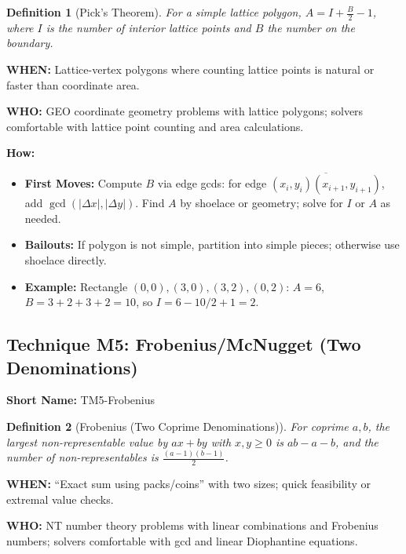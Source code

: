 \documentclass[12pt]{article}
\newtheorem{definition}{Definition}[section]
\begin{document}
\begin{definition}[Pick's Theorem]
For a simple lattice polygon, $A = I + \tfrac{B}{2} - 1$, where $I$ is the number of interior lattice points and $B$ the number on the boundary.
\end{definition}

\textbf{WHEN:} Lattice-vertex polygons where counting lattice points is natural or faster than coordinate area.

\textbf{WHO:} GEO coordinate geometry problems with lattice polygons; solvers comfortable with lattice point counting and area calculations.

\textbf{How:}
\begin{itemize}
    \item \textbf{First Moves:} Compute $B$ via edge gcds: for edge $\overline{(x_i,y_i)(x_{i+1},y_{i+1})}$, add $\gcd(|\Delta x|,|\Delta y|)$. Find $A$ by shoelace or geometry; solve for $I$ or $A$ as needed.
    \item \textbf{Bailouts:} If polygon is not simple, partition into simple pieces; otherwise use shoelace directly.
    \item \textbf{Example:} Rectangle $(0,0),(3,0),(3,2),(0,2)$: $A=6$, $B=3+2+3+2=10$, so $I=6-10/2+1=2$.
\end{itemize}

\subsection{Technique M5: Frobenius/McNugget (Two Denominations)}
\textbf{Short Name:} TM5-Frobenius

\begin{definition}[Frobenius (Two Coprime Denominations)]
For coprime $a,b$, the largest non\mbox{-}representable value by $ax+by$ with $x,y\ge 0$ is $ab-a-b$, and the number of non\mbox{-}representables is $\tfrac{(a-1)(b-1)}{2}$.
\end{definition}

\textbf{WHEN:} ``Exact sum using packs/coins'' with two sizes; quick feasibility or extremal value checks.

\textbf{WHO:} NT number theory problems with linear combinations and Frobenius numbers; solvers comfortable with gcd and linear Diophantine equations.
\end{document}
